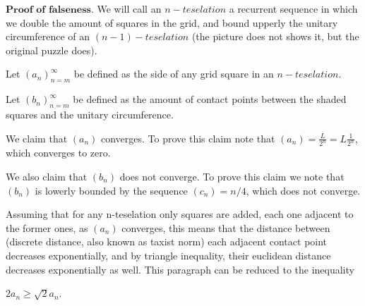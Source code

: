 \documentclass{article}
\theoremstyle{remark}
\begin{document}
\begin{enumerate}
\begin{center}
        \end{center}
        $\textbf{Proof of falseness.}$ We will call an $n-teselation$ a recurrent sequence in which we 
        double the amount of squares in the grid, and bound upperly the unitary
        circumference of an $(n-1)-teselation$ (the picture does not shows it, but the original puzzle does). 
        
        Let $(a_n)_{n=m}^{\infty}$ be defined as the side of any grid
        square in an $n-teselation$. 

        Let $(b_n)_{n=m}^{\infty}$ be defined as the amount of contact points
        between the shaded squares and the unitary circumference.
        
        We claim that $(a_n)$ converges. To prove this claim note that $\displaystyle (a_n) = \frac{L}{2^n} = L\frac{1}{2^n}$,
        which converges to zero.

        We also claim that $(b_n)$ does not converge. To prove this claim we note that $(b_n)$ is lowerly bounded by the sequence $(c_n) = n/4$, which does not converge.
        
        Assuming that for any n-teselation only squares are added, each one adjacent to the former ones, as $(a_n)$ converges, this means that the distance between (discrete distance, also known as taxist norm) each adjacent contact point
        decreases exponentially, and by triangle inequality, their euclidean distance decreases exponentially as well. This paragraph can be reduced to the inequality 
        \begin{center}
            $\displaystyle 2a_n \geq \sqrt{2}a_n$.
        \end{center}


\end{enumerate}
\end{document}
